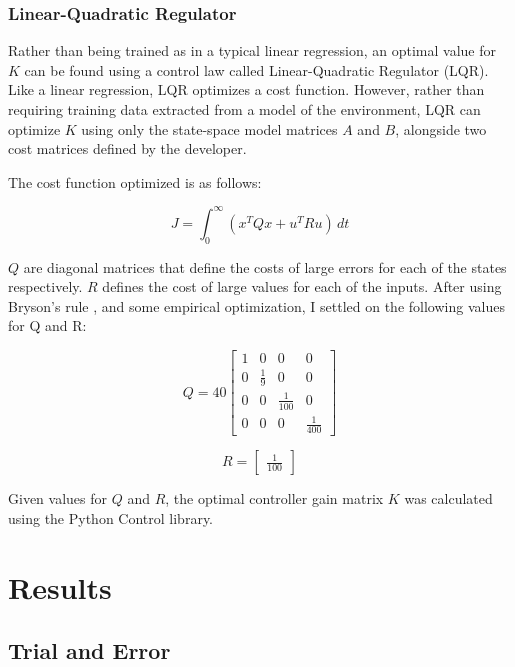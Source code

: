 \documentclass[12pt]{article}
\begin{document}
\subsubsection{Linear-Quadratic Regulator}

Rather than being trained as in a typical linear regression, an optimal value for $K$ can be found using a control law called Linear-Quadratic Regulator (LQR). Like a linear regression, LQR optimizes a cost function. However, rather than requiring training data extracted from a model of the environment, LQR can optimize $K$ using only the state-space model matrices $A$ and $B$, alongside two cost matrices defined by the developer.

The cost function optimized is as follows:

\begin{equation}
    J = \int _0 ^{\infty} \! (x ^T Q x + u ^T R u) \, dt
\end{equation}

$Q$ are diagonal matrices that define the costs of large errors for each of the states respectively. $R$ defines the cost of large values for each of the inputs. After using Bryson's rule \cite{veness}, and some empirical optimization, I settled on the following values for Q and R:

\begin{equation}
    Q = 40 \begin{bmatrix}
        1 & 0 & 0 & 0 \\
        0 & \frac{1}{9} & 0 & 0 \\
        0 & 0 & \frac{1}{100} & 0 \\
        0 & 0 & 0 & \frac{1}{400}
    \end{bmatrix}
\end{equation}

\begin{equation}
    R = \begin{bmatrix}
        \displaystyle
        \frac{1}{100}
    \end{bmatrix}
\end{equation}

Given values for $Q$ and $R$, the optimal controller gain matrix $K$ was calculated using the Python Control library.

\section{Results}

\subsection{Trial and Error}
\end{document}
